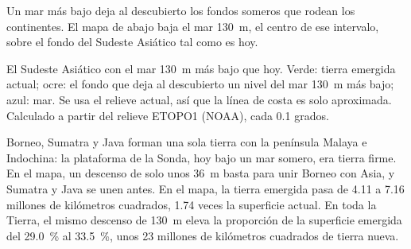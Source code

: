 Un mar más bajo deja al descubierto los fondos someros que rodean los continentes. El mapa de abajo
baja el mar \qty{130}{m}, el centro de ese intervalo, sobre el fondo del
Sudeste Asiático tal como es hoy.

\begin{omfigure}

{\small El Sudeste Asiático con el mar \qty{130}{m} más bajo que hoy. Verde:
tierra emergida actual; ocre: el fondo que deja al descubierto un nivel del mar \qty{130}{m} más bajo; azul:
mar. Se usa el relieve actual, así que la línea de costa es solo aproximada.
Calculado a partir del relieve ETOPO1 (NOAA), cada 0.1 grados.}
\end{omfigure}

Borneo, Sumatra y Java forman una sola tierra con la península Malaya e
Indochina: la plataforma de la Sonda, hoy bajo un mar somero, era tierra firme. En el mapa, un
descenso de solo unos \qty{36}{m} basta para unir Borneo con Asia, y Sumatra y
Java se unen antes. En el mapa,
la tierra emergida pasa de 4.11 a 7.16 millones de kilómetros cuadrados,
1.74 veces la superficie actual. En toda la Tierra, el mismo descenso de \qty{130}{m} eleva
la proporción de la superficie emergida del \qty{29.0}{\percent} al
\qty{33.5}{\percent}, unos 23 millones de kilómetros cuadrados de tierra nueva.

